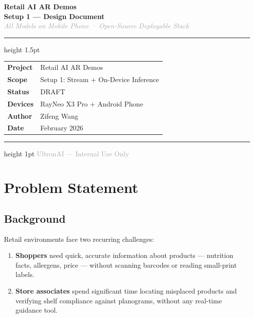 \documentclass[11pt,a4paper]{article}
\begin{document}

\begin{titlepage}
  \centering
  \vspace*{2cm}
  {\Huge\bfseries\color{primary} Retail AI AR Demos\\[0.4em]}
  {\LARGE\bfseries Setup 1 — Design Document\\[1em]}
  \textcolor{darkgray}{\large\textit{All Models on Mobile Phone · Open-Source Deployable Stack}}\\[2em]
  \hrule height 1.5pt \vspace{0.5em}
  \begin{tabular}{ll}
    \textbf{Project}   & Retail AI AR Demos                    \\
    \textbf{Scope}     & Setup 1: Stream + On-Device Inference \\
    \textbf{Status}    & DRAFT                                 \\
    \textbf{Devices}   & RayNeo X3 Pro + Android Phone         \\
    \textbf{Author}    & Zifeng Wang                           \\
    \textbf{Date}      & February 2026                         \\
  \end{tabular}
  \vspace{0.5em}\hrule height 1pt
  \vfill
  {\small\textcolor{darkgray}{UltronAI — Internal Use Only}}
\end{titlepage}

\tableofcontents
\newpage

\section{Problem Statement}

\subsection{Background}

Retail environments face two recurring challenges:

\begin{enumerate}
  \item \textbf{Shoppers} need quick, accurate information about products ---
        nutrition facts, allergens, price --- without scanning barcodes or reading
        small-print labels.
  \item \textbf{Store associates} spend significant time locating misplaced
        products and verifying shelf compliance against planograms, without any
        real-time guidance tool.
\end{enumerate}
\end{document}
